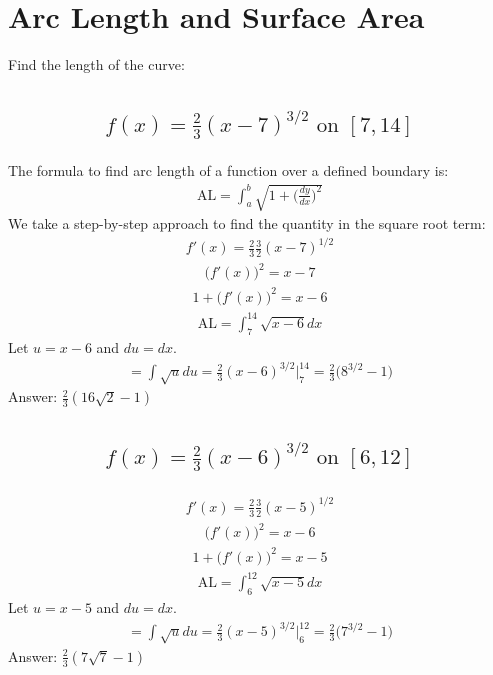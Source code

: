 \documentclass{article}
\begin{document}
\section{Arc Length and Surface Area}
Find the length of the curve:
\subsection{
	\begin{align*}
		f(x) = \frac{2}{3} (x - 7)^{3/2} \text{ on } [7, 14]
	\end{align*}
}
The formula to find arc length of a function over a defined boundary is:
\begin{align*}
	\text{AL} = \int_a^b{\sqrt{1 + \bigg( \frac{dy}{dx} \bigg)^2}}
\end{align*}
We take a step-by-step approach to find the quantity in the square root term:
\begin{align*}
	f'(x) = \frac{2}{3} \frac{3}{2} (x - 7)^{1/2}
\end{align*}
\begin{align*}
	\bigg( f'(x) \bigg)^2 = x - 7
\end{align*}
\begin{align*}
	1 + \bigg( f'(x) \bigg)^2 = x - 6
\end{align*}
\begin{align*}
	\text{AL} = \int_7^14{\sqrt{x - 6} dx}
\end{align*}
Let $u = x - 6$ and $du = dx$.
\begin{align*}
	= \int{\sqrt{u}du} = \frac{2}{3} (x - 6)^{3/2} \bigg|_7^{14} = \frac{2}{3} \bigg( 8^{3/2} - 1 \bigg)
\end{align*}
Answer: $\frac{2}{3} (16 \sqrt{2} - 1)$

\subsection{
	\begin{align*}
		f(x) = \frac{2}{3} (x - 6)^{3/2} \text{ on } [6, 12]
	\end{align*}
}
\begin{align*}
	f'(x) = \frac{2}{3} \frac{3}{2} (x - 5)^{1/2}
\end{align*}
\begin{align*}
	\bigg( f'(x) \bigg)^2 = x - 6
\end{align*}
\begin{align*}
	1 + \bigg( f'(x) \bigg)^2 = x - 5
\end{align*}
\begin{align*}
	\text{AL} = \int_6^{12}{\sqrt{x - 5}dx}
\end{align*}
Let $u = x - 5$ and $du = dx$.
\begin{align*}
	= \int{\sqrt{u}du} = \frac{2}{3} (x - 5)^{3/2} \bigg|_6^{12} = \frac{2}{3} \bigg( 7^{3/2} - 1 \bigg)
\end{align*}
Answer: $\frac{2}{3} (7\sqrt{7} - 1)$
\end{document}
